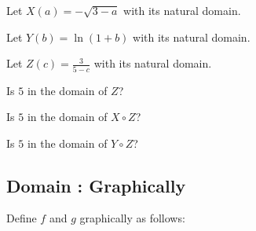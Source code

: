 \documentclass{ximera}
\begin{document}
\begin{example}


Let $X(a) = -\sqrt{3 - a}$ with its natural domain.


Let $Y(b) = \ln(1 + b)$ with its natural domain.


Let $Z(c) = \frac{3}{5 - c}$ with its natural domain.



\begin{question}

Is $5$ in the domain of $Z$?

\begin{multipleChoice}
\end{multipleChoice}

\end{question}





\begin{question}

Is $5$ in the domain of $X \circ Z$?

\begin{multipleChoice}
\end{multipleChoice}

\end{question}



\begin{question}

Is $5$ in the domain of $Y \circ Z$?

\begin{multipleChoice}
\end{multipleChoice}

\end{question}




\end{example}






\subsection*{Domain : Graphically}

Define $f$ and $g$ graphically as follows:
\end{document}
